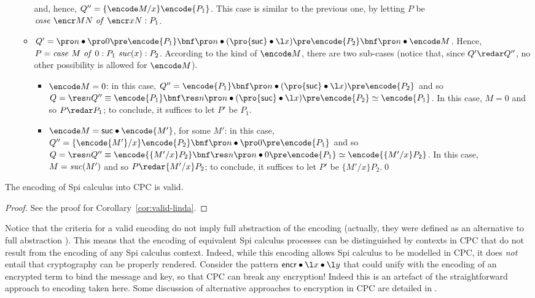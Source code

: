 \documentclass{LMCS}
\renewcommand{\beq}{\simeq}
\begin{document}
\begin{itemize}
\begin{itemize}
								and, hence, $Q'' = \{\encode M/x\}\encode{P_1}$.
								This case is similar to the previous one, by letting $P$ be
								${\it case}\ \encr M N\ {\it of}\ \encr x N:P_1$.
					\item $Q' = \pro n\bullet \pro 0\pre \encode {P_1}
								\bnf\pro n\bullet (\pro {{\sf suc}}\bullet \l x)\pre \encode {P_2}
								\bnf\pro n\bullet \encode M$.
								Hence, $P = {\it case}\ M\ {\it of}\ 0:P_1\ {\it suc}(x):P_2$.
								According to the kind of $\encode M$, there are two sub-cases
								(notice that, since $Q' \redar Q''$, no other possibility is allowed for $\encode M$).
								\begin{itemize}
									\item $\encode M = 0$: in this case, $Q'' = \encode {P_1}
												\bnf \pro n\bullet (\pro {{\sf suc}}\bullet \l x)\pre\encode {P_2}$
												and so $Q = \res n Q'' \equiv \encode {P_1}
												\bnf\res n\pro n\bullet(\pro {{\sf suc}}\bullet\l x)\pre\encode {P_2}
												\beq \encode {P_1}$.
												In this case, $M = 0$ and so $P \redar P_1$; to conclude,
												it suffices to let $P'$ be $P_1$.
									\item $\encode M = {\sf suc} \bullet \encode {M'}$, for some $M'$:
												in this case, $Q'' = \{\encode{M'}/x\}\encode {P_2} \bnf
												\pro n\bullet \pro 0\pre \encode {P_1}$
												and so $Q = \res n Q'' \equiv \encode {\{M'/x\}P_2}\bnf\res n
												\pro n\bullet 0\pre \encode {P_1}
												\beq \encode {\{M'/x\}P_2}$.
												In this case, $M = {\it suc}(M')$ and so $P \redar \{M'/x\}P_2$; to conclude, 
												it suffices to let $P'$ be $\{M'/x\}P_2$.\qed
								\end{itemize}
				\end{itemize}
\end{itemize}

\begin{cor}
\label{cor:valid-spi}
The encoding of Spi calculus into CPC is valid.
\end{cor}
\begin{proof}
See the proof for Corollary~\ref{cor:valid-linda}. 
\end{proof}

Notice that the criteria for a valid encoding do not imply full
abstraction of the encoding (actually, they were defined as an alternative to full abstraction
\cite{G:IC08,G:CONCUR08}). This means that the encoding of equivalent
Spi calculus processes can be distinguished by contexts in CPC that do not result from the
encoding of any Spi calculus context. Indeed, while this encoding allows Spi calculus to be modelled in
CPC, it does {\em not} entail that cryptography can be properly rendered.
Consider the pattern ${\sf encr}\bullet \l x \bullet \l y$ that could unify with the encoding of an encrypted term
to bind the message and key, so that CPC can break any encryption!
Indeed this is an artefact of the straightforward approach to encoding taken here.
Some discussion of alternative approaches to encryption in CPC are detailed in 
\cite{GivenWilsonPHD}.
\end{document}
